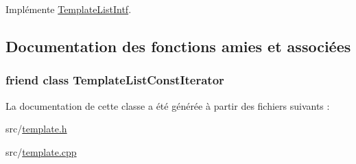 Implémente \hyperlink{class_template_list_intf_a0c53169c740c09dac47efc62bbe39674}{Template\+List\+Intf}.



\subsection{Documentation des fonctions amies et associées}
\hypertarget{class_template_list_a5f57a87e481b901242e6e7e90bc03e2b}{}
\subsubsection[{Template\+List\+Const\+Iterator}]{\setlength{\rightskip}{0pt plus 5cm}friend class {\bf Template\+List\+Const\+Iterator}\hspace{0.3cm}{\ttfamily [friend]}}\label{class_template_list_a5f57a87e481b901242e6e7e90bc03e2b}


La documentation de cette classe a été générée à partir des fichiers suivants \+:\begin{DoxyCompactItemize}
\item 
src/\hyperlink{template_8h}{template.\+h}\item 
src/\hyperlink{template_8cpp}{template.\+cpp}\end{DoxyCompactItemize}
